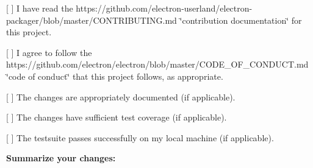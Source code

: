 
\begin{DoxyItemize}
\item \mbox{[} \mbox{]} I have read the https\+://github.com/electron-\/userland/electron-\/packager/blob/master/\+C\+O\+N\+T\+R\+I\+B\+U\+T\+I\+N\+G.\+md \char`\"{}contribution documentation\char`\"{} for this project.
\item \mbox{[} \mbox{]} I agree to follow the https\+://github.com/electron/electron/blob/master/\+C\+O\+D\+E\+\_\+\+O\+F\+\_\+\+C\+O\+N\+D\+U\+C\+T.\+md \char`\"{}code of conduct\char`\"{} that this project follows, as appropriate.
\item \mbox{[} \mbox{]} The changes are appropriately documented (if applicable).
\item \mbox{[} \mbox{]} The changes have sufficient test coverage (if applicable).
\item \mbox{[} \mbox{]} The testsuite passes successfully on my local machine (if applicable).
\end{DoxyItemize}

{\bfseries Summarize your changes\+:} 